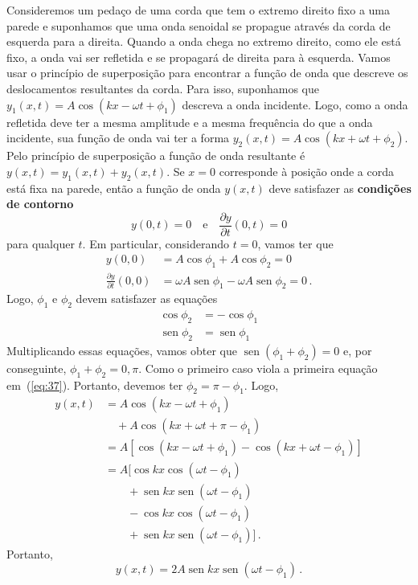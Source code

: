 \documentclass[twocolumn=on,fontsize=12pt,DIV=calc]{scrartcl}
\theoremstyle{definition}
\DeclareMathOperator{\sen}{sen}
\begin{document}
Consideremos um pedaço de uma corda que tem o extremo direito fixo a
uma parede e suponhamos que uma onda senoidal se propague através da
corda de esquerda para a direita. Quando a onda chega no extremo
direito, como ele está fixo, a onda vai ser refletida e se propagará
de direita para à esquerda. Vamos usar o princípio de superposição
para encontrar a função de onda que descreve os deslocamentos
resultantes da corda. Para isso, suponhamos que
$y_1(x,t)=A\cos(kx-\omega t+\phi_1)$ descreva a onda incidente. Logo,
como a onda refletida deve ter a mesma amplitude e a mesma frequência
do que a onda incidente, sua função de onda vai ter a forma
$y_2(x,t)=A\cos(kx+\omega t+\phi_2)$. Pelo princípio de superposição a
função de onda resultante é $y(x,t)=y_1(x,t)+y_2(x,t)$. Se $x=0$
corresponde à posição onde a corda está fixa na parede, então a função
de onda $y(x,t)$ deve satisfazer as \textbf{condições de contorno}
$$y(0,t)=0\quad\text{e}\quad \frac{\partial y}{\partial t}(0,t)=0$$
para qualquer $t$. Em particular, considerando $t=0$, vamos ter que
\begin{equation*}
  \begin{split}
    y(0,0)&=A\cos\phi_1+A\cos\phi_2=0\\
    \frac{\partial y}{\partial t}(0,0)&=\omega A\sen\phi_1-\omega
    A\sen\phi_2=0\,.
  \end{split}
\end{equation*}
Logo, $\phi_1$ e $\phi_2$ devem satisfazer as equações
\begin{equation}
  \label{eq:37}
  \begin{split}
    \cos\phi_2&=-\cos\phi_1\\
    \sen\phi_2&=\sen\phi_1
  \end{split}
\end{equation}
Multiplicando essas equações, vamos obter que $\sen(\phi_1+\phi_2)=0$
e, por conseguinte, $\phi_1+\phi_2=0,\pi$. Como o primeiro caso viola
a primeira equação em~(\ref{eq:37}). Portanto, devemos ter
$\phi_2=\pi-\phi_1$. Logo,
\begin{equation*}
  \begin{split}
    y(x,t)&=A\cos(kx-\omega t+\phi_1)\\
    &\quad +A\cos(kx+\omega t+\pi-\phi_1)\\
    &=A[\cos(kx-\omega t+\phi_1)-\cos(kx+\omega t-\phi_1)]\\
    &=A[\cos kx\cos(\omega t-\phi_1)\\
    &\qquad+\sen kx\sen(\omega t-\phi_1)\\
    &\qquad-\cos kx\cos(\omega t-\phi_1)\\
    &\qquad+\sen kx\sen(\omega t-\phi_1)]\,.
  \end{split}
\end{equation*}
Portanto,
\begin{equation}
  \label{eq:38}
  y(x,t)=2A\sen kx\sen(\omega t-\phi_1)\,.
\end{equation}
\end{document}
